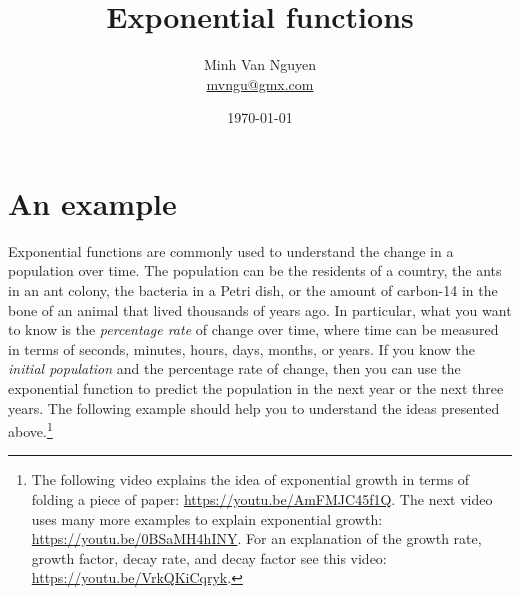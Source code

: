 \documentclass[a4paper,oneside,12pt]{article}
\begin{document}
\title{\Large\bf Exponential functions}
\author{%
  Minh Van Nguyen \\
  \url{mvngu@gmx.com}
}
\date{\today}
\maketitle



\section{An example}

Exponential functions are commonly used to understand the change in a
population over time.  The population can be the residents of a
country, the ants in an ant colony, the bacteria in a Petri dish, or
the amount of carbon-14 in the bone of an animal that lived thousands
of years ago.  In particular, what you want to know is the
\emph{percentage rate} of change over time, where time can be measured
in terms of seconds, minutes, hours, days, months, or years.  If you
know the \emph{initial population} and the percentage rate of change,
then you can use the exponential function to predict the population
in the next year or the next three years.  The following example
should help you to understand the ideas presented above.\footnote{
  The following video explains the idea of exponential growth in terms
  of folding a piece of paper:
  \url{https://youtu.be/AmFMJC45f1Q}.
  The next video uses many more examples to explain exponential
  growth:
  \url{https://youtu.be/0BSaMH4hINY}.
  For an explanation of the growth rate, growth factor, decay rate,
  and decay factor see this video:
  \url{https://youtu.be/VrkQKiCqryk}.
}
\end{document}
